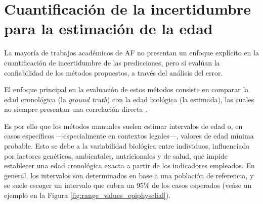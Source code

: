 
\section{Cuantificación de la incertidumbre para la estimación de la edad}

La mayoría de trabajos académicos de AF no presentan un enfoque explícito en la cuantificación de 
incertidumbre de las predicciones, pero sí evalúan la confiabilidad de los métodos propuestos, a través 
del análisis del error. 

El enfoque principal en la evaluación de estos métodos consiste en comparar la edad cronológica  
(la \textit{ground truth}) con la edad biológica (la estimada), las cuales no siempre presentan una 
correlación directa \cite{marquez2015}.

Es por ello que los métodos manuales suelen estimar intervalos de edad o, en casos específicos 
---especialmente en contextos legales---, valores de edad mínima probable. Esto se debe a la variabilidad 
biológica entre individuos, influenciada por factores genéticos, ambientales, nutricionales y de salud, que 
impide establecer una edad cronológica exacta a partir de los indicadores empleados.
En general, los intervalos son determinados en base a una población de referencia, y se suele escoger un
intervalo que cubra un 95\% de los casos esperados \cite{garvin2012} (veáse un ejemplo en la Figura
\ref{fig:range_values_epiphyselial}).


